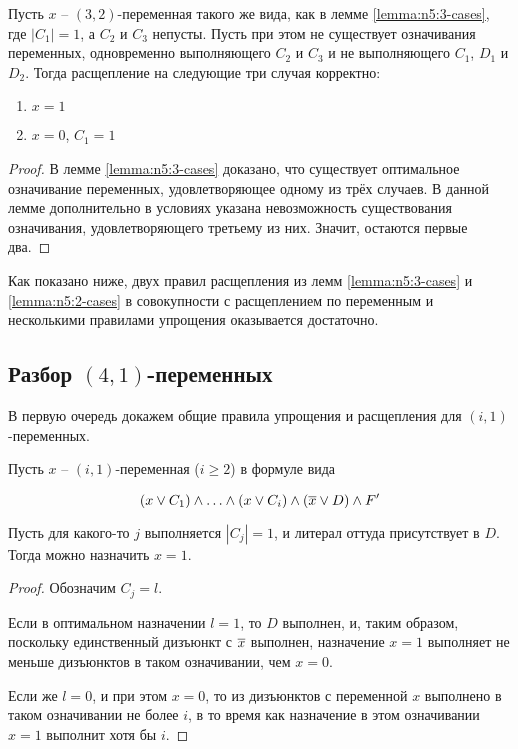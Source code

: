 \begin{lemma}
 Пусть $x$ -- $(3,2)$-переменная такого же вида, как в лемме \ref{lemma:n5:3-cases}, где $|C_1| = 1$, а $C_2$ и $C_3$ непусты. Пусть при этом не существует означивания переменных, одновременно выполняющего $C_2$ и $C_3$ и не выполняющего $C_1$, $D_1$ и $D_2$. Тогда расщепление на следующие три случая корректно:

 \begin{enumerate}
  \item $x = 1$
  \item $x = 0$, $C_1 = 1$
 \end{enumerate}
 \label{lemma:n5:2-cases}
\end{lemma}

\begin{proof}
 В лемме \ref{lemma:n5:3-cases} доказано, что существует оптимальное означивание переменных, удовлетворяющее одному из трёх случаев. В данной лемме дополнительно в условиях указана невозможность существования означивания, удовлетворяющего третьему из них. Значит, остаются первые два.
\end{proof}

Как показано ниже, двух правил расщепления из лемм \ref{lemma:n5:3-cases} и \ref{lemma:n5:2-cases} в совокупности с расщеплением по переменным и несколькими правилами упрощения оказывается достаточно.

\subsection{Разбор $(4,1)$-переменных}
\label{subsec:n5:41}

\firstpar{}В первую очередь докажем общие правила упрощения и расщепления для $(i,1)$-переменных.

\begin{rrule}
 Пусть $x$ -- $(i,1)$-переменная ($i \geq 2$) в формуле вида

 $$
  (x \vee C_1) \wedge \ldots \wedge (x \vee C_i) \wedge (\overline{x} \vee D) \wedge F'
 $$

 Пусть для какого-то $j$ выполняется $|C_j| = 1$, и литерал оттуда присутствует в $D$. Тогда можно назначить $x = 1$.
 \label{rrule:n5:i1}
\end{rrule}

\begin{proof}
 Обозначим $C_j = l$.

 Если в оптимальном назначении $l = 1$, то $D$ выполнен, и, таким образом, поскольку единственный дизъюнкт с $\overline{x}$ выполнен, назначение $x = 1$ выполняет не меньше дизъюнктов в таком означивании, чем $x = 0$.

 Если же $l = 0$, и при этом $x = 0$, то из дизъюнктов с переменной $x$ выполнено в таком означивании не более $i$, в то время как назначение в этом означивании $x = 1$ выполнит хотя бы $i$.
\end{proof}

